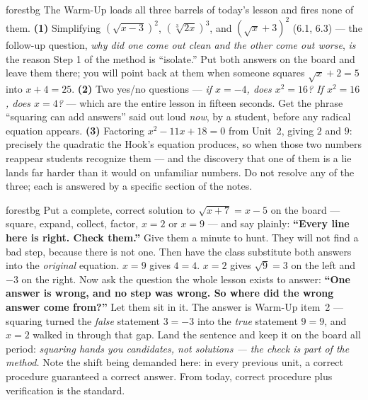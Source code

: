 \documentclass[10pt]{article}
\begin{document}
\begin{fixedskillbox}{forestbg}
    The Warm-Up loads all three barrels of today's lesson and fires none of them.
    \textbf{(1)} Simplifying $\left(\sqrt{x-3}\right)^{2}$, $\left(\sqrt[3]{2x}\right)^{3}$, and
    $\left(\sqrt{x}+3\right)^{2}$ (6.1, 6.3) --- the follow-up question, \emph{why did one come out
    clean and the other come out worse}, \emph{is} the reason Step 1 of the method is ``isolate.''
    Put both answers on the board and leave them there; you will point back at them when someone
    squares $\sqrt{x}+2=5$ into $x+4=25$. \textbf{(2)} Two yes/no questions --- \emph{if $x=-4$,
    does $x^{2}=16$? If $x^{2}=16$, does $x=4$?} --- which are the entire lesson in fifteen seconds.
    Get the phrase ``squaring can add answers'' said out loud \emph{now}, by a student, before any
    radical equation appears. \textbf{(3)} Factoring $x^{2}-11x+18=0$ from Unit~2, giving $2$ and
    $9$: precisely the quadratic the Hook's equation produces, so when those two numbers reappear
    students recognize them --- and the discovery that one of them is a lie lands far harder than it
    would on unfamiliar numbers. Do not resolve any of the three; each is answered by a specific
    section of the notes.
\end{fixedskillbox}

\begin{skillbox}[Hook]{forestbg}
    Put a complete, correct solution to $\sqrt{x+7}=x-5$ on the board --- square, expand, collect,
    factor, $x=2$ or $x=9$ --- and say plainly: \textbf{``Every line here is right. Check them.''}
    Give them a minute to hunt. They will not find a bad step, because there is not one. Then have
    the class substitute both answers into the \emph{original} equation. $x=9$ gives $4=4$. $x=2$
    gives $\sqrt{9}=3$ on the left and $-3$ on the right. Now ask the question the whole lesson
    exists to answer: \textbf{``One answer is wrong, and no step was wrong. So where did the wrong
    answer come from?''} Let them sit in it. The answer is Warm-Up item~2 --- squaring turned the
    \emph{false} statement $3=-3$ into the \emph{true} statement $9=9$, and $x=2$ walked in through
    that gap. Land the sentence and keep it on the board all period: \emph{squaring hands you
    candidates, not solutions --- the check is part of the method.} Note the shift being demanded
    here: in every previous unit, a correct procedure guaranteed a correct answer. From today,
    correct procedure plus verification is the standard.
\end{skillbox}
\end{document}
